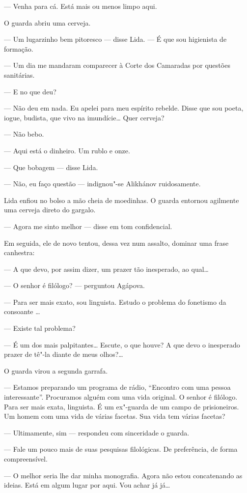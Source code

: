 --- Venha para cá. Está mais ou menos limpo aqui.

O guarda abriu uma cerveja.

--- Um lugarzinho bem pitoresco --- disse Lida. --- É que sou higienista
de formação.

--- Um dia me mandaram comparecer à Corte dos Camaradas por questões
sanitárias.

--- E no que deu?

--- Não deu em nada. Eu apelei para meu espírito rebelde. Disse que sou
poeta, iogue, budista, que vivo na imundície\ldots{} Quer cerveja?

--- Não bebo.

--- Aqui está o dinheiro. Um rublo e onze.

--- Que bobagem --- disse Lida.

--- Não, eu faço questão --- indignou"-se Alikhánov ruidosamente.

Lida enfiou no bolso a mão cheia de moedinhas. O guarda entornou
agilmente uma cerveja direto do gargalo.

--- Agora me sinto melhor --- disse em tom confidencial.

Em seguida, ele de novo tentou, dessa vez num assalto, dominar uma frase
canhestra:

--- A que devo, por assim dizer, um prazer tão inesperado, ao qual\ldots{}

--- O senhor é filólogo? --- perguntou Agápova.

--- Para ser mais exato, sou linguista. Estudo o problema do fonetismo
da consoante \ldots{}

--- Existe tal problema?

--- É um dos mais palpitantes\ldots{} Escute, o que houve? A que devo o
inesperado prazer de tê"-la diante de meus olhos?\ldots{}

O guarda virou a segunda garrafa.

--- Estamos preparando um programa de rádio, ``Encontro com uma pessoa
interessante''. Procuramos alguém com uma vida original. O senhor é
filólogo. Para ser mais exata, linguista. É um ex"-guarda de um campo de
prisioneiros. Um homem com uma vida de várias facetas. Sua vida tem
várias facetas?

--- Ultimamente, sim --- respondeu com sinceridade o guarda.

--- Fale um pouco mais de suas pesquisas filológicas. De preferência, de
forma compreensível.

--- O melhor seria lhe dar minha monografia. Agora não estou
concatenando as ideias. Está em algum lugar por aqui. Vou achar já já\ldots{}

